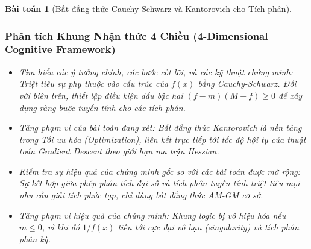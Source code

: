 \documentclass{article}
\newtheorem{baitoan}{Bài toán}
\begin{document}
\begin{baitoan}[Bất đẳng thức Cauchy-Schwarz và Kantorovich cho Tích phân]


 \subsubsection*{Phân tích Khung Nhận thức 4 Chiều (4-Dimensional Cognitive Framework)}
 \begin{itemize}
 \item \textit{Tìm hiểu các ý tưởng chính, các bước cốt lõi, và các kỹ thuật chứng minh}: Triệt tiêu sự phụ thuộc vào cấu trúc của $f(x)$ bằng Cauchy-Schwarz. Đối với biên trên, thiết lập điều kiện dấu bậc hai $(f-m)(M-f) \ge 0$ để xây dựng ràng buộc tuyến tính cho các tích phân.
 \item \textit{Tăng phạm vi của bài toán đang xét}: Bất đẳng thức Kantorovich là nền tảng trong Tối ưu hóa (Optimization), liên kết trực tiếp tới tốc độ hội tụ của thuật toán Gradient Descent theo giới hạn ma trận Hessian.
 \item \textit{Kiểm tra sự hiệu quả của chứng minh gốc so với các bài toán được mở rộng}: Sự kết hợp giữa phép phân tích đại số và tích phân tuyến tính triệt tiêu mọi nhu cầu giải tích phức tạp, chỉ dùng bất đẳng thức AM-GM cơ sở.
 \item \textit{Tăng phạm vi hiệu quả của chứng minh}: Khung logic bị vô hiệu hóa nếu $m \le 0$, vì khi đó $1/f(x)$ tiến tới cực đại vô hạn (singularity) và tích phân phân kỳ.
 \end{itemize}
\end{baitoan}

\end{document}
